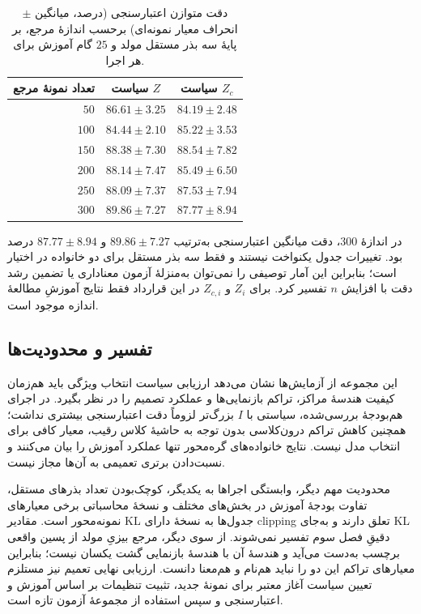 \begin{table}[htbp]
\centering\small
\caption{دقت متوازن اعتبارسنجی (درصد، میانگین $\pm$ انحراف معیار نمونه‌ای) برحسب اندازهٔ مرجع، بر پایهٔ سه بذر مستقل مولد و $25$ گام آموزش برای هر اجرا.}
\label{tab:ch4-v1-size-three-seeds}
\begin{tabular}{rcc}\hline
تعداد نمونهٔ مرجع & سیاست $Z$ & سیاست $Z_c$\\\hline
$50$ & $86.61\pm3.25$ & $84.19\pm2.48$\\
$100$ & $84.44\pm2.10$ & $85.22\pm3.53$\\
$150$ & $88.38\pm7.30$ & $88.54\pm7.82$\\
$200$ & $88.14\pm7.47$ & $85.49\pm6.50$\\
$250$ & $88.09\pm7.37$ & $87.53\pm7.94$\\
$300$ & $89.86\pm7.27$ & $87.77\pm8.94$\\
\hline
\end{tabular}
\end{table}

در اندازهٔ $300$، دقت میانگین اعتبارسنجی به‌ترتیب $89.86\pm7.27$ و $87.77\pm8.94$ درصد بود. تغییرات جدول یکنواخت نیستند و فقط سه بذر مستقل برای دو خانواده در اختیار است؛ بنابراین این آمار توصیفی را نمی‌توان به‌منزلهٔ آزمون معناداری یا تضمین رشد دقت با افزایش $n$ تفسیر کرد. برای $Z_i$ و $Z_{c,i}$ در این قرارداد فقط نتایج آموزشِ مطالعهٔ اندازه موجود است.

\subsection{تفسیر و محدودیت‌ها}
\label{subsec:ch4-v1-bayes-scope}

این مجموعه از آزمایش‌ها نشان می‌دهد ارزیابی سیاست انتخاب ویژگی باید هم‌زمان کیفیت هندسهٔ مراکز، تراکم بازنمایی‌ها و عملکرد تصمیم را در نظر بگیرد. در اجرای هم‌بودجهٔ بررسی‌شده، سیاستی با $I$ بزرگ‌تر لزوماً دقت اعتبارسنجی بیشتری نداشت؛ همچنین کاهش تراکم درون‌کلاسی بدون توجه به حاشیهٔ کلاس رقیب، معیار کافی برای انتخاب مدل نیست. نتایج خانواده‌های گره‌محور تنها عملکرد آموزش را بیان می‌کنند و نسبت‌دادن برتری تعمیمی به آن‌ها مجاز نیست.

محدودیت مهم دیگر، وابستگی اجراها به یکدیگر، کوچک‌بودن تعداد بذرهای مستقل، تفاوت بودجهٔ آموزش در بخش‌های مختلف و نسخهٔ محاسباتی برخی معیارهای نمونه‌محور است. مقادیر KL جدول‌ها به نسخهٔ دارای clipping تعلق دارند و به‌جای KL دقیقِ فصل سوم تفسیر نمی‌شوند. از سوی دیگر، مرجع بیزیِ مولد از پسین واقعی برچسب به‌دست می‌آید و هندسهٔ آن با هندسهٔ بازنمایی گشت یکسان نیست؛ بنابراین معیارهای تراکم این دو را نباید هم‌نام و هم‌معنا دانست. ارزیابی نهایی تعمیم نیز مستلزم تعیین سیاست آغاز معتبر برای نمونهٔ جدید، تثبیت تنظیمات بر اساس آموزش و اعتبارسنجی و سپس استفاده از مجموعهٔ آزمون تازه است.

